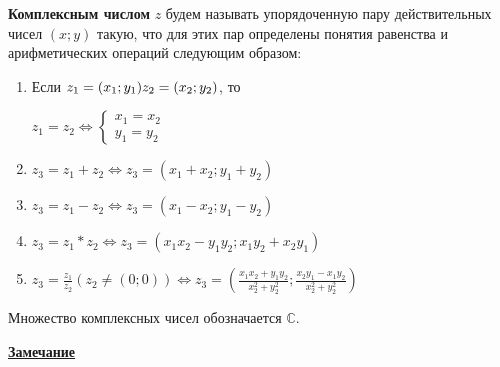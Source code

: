 \documentclass{article}
\begin{document}
\textbf{Комплексным числом} $z$ будем называть упорядоченную пару действительных
чисел $(x;y)$ такую, что для этих пар определены понятия равенства и арифметических
операций следующим образом:

\begin{enumerate}
    \item Если $\\ z_1 = (x_1;y_1) \\ z_2 = (x_2;y_2)$, то
    
    $z_1 = z_2 \Leftrightarrow \begin{cases}
        x_1 = x_2 \\
        y_1 = y_2
    \end{cases}$

    \item $z_3 = z_1 + z_2 \Leftrightarrow z_3 = (x_1 + x_2; y_1 + y_2)$
    \item $z_3 = z_1 - z_2 \Leftrightarrow z_3 = (x_1 - x_2; y_1 - y_2)$
    \item $z_3 = z_1 * z_2 \Leftrightarrow z_3 = (x_1 x_2 - y_1 y_2; x_1 y_2 + x_2 y_1)$
    \item $z_3 = \frac{z_1}{z_2} (z_2 \neq (0; 0)) \Leftrightarrow 
    z_3 = (\frac{x_1 x_2 + y_1 y_2}{x_2^2 + y_2^2}; \frac{x_2 y_1 - x_1 y_2}{x_2^2 + y_2^2})$
\end{enumerate}

Множество комплексных чисел обозначается $\mathbb{C}$.

\underline{\textbf{Замечание}}
\end{document}
